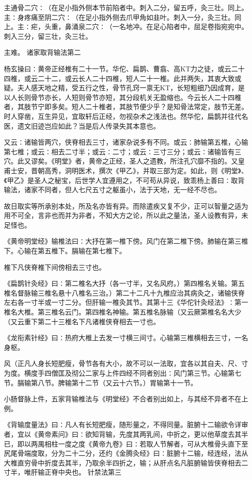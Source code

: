 \documentclass[a4paper,12pt,UTF8,twoside]{ctexbook}
\begin{document}
主通骨二穴∶（在足小指外侧本节前陷者中。刺入二分，留五呼，灸三壮。同上。主∶身疼痛至阴二穴∶（在足小指外侧去爪甲角如韭叶。刺入一分，灸三壮。同上。主∶疟，头重，鼻涌泉二穴∶（一名地冲。在足心陷者中，屈足卷指宛宛中。刺入三分，留三壮，灸三壮。

主难。
诸家取背输法第二

杨玄操曰∶黄帝正经椎有二十一节。华佗、扁鹊、曹翕、高KT力之徒，或云二十四椎，或云二十二，或云长人二十四椎，短人二十一椎。此并两失，其衷大致或疑。夫人感天地之精，受五行之性，骨节孔窍一禀无KT，长短粗细乃因成育，是以人长则骨节亦长，人短则骨节亦短，其分段机关无盈缩也。今云长人二十四椎者，其肢节宁即多矣。短人二十椎者，其肢节便少乎？是知骨法常定，肢节无差。时人穿凿，互生异见，宜取轩后正经，勿视杂术之浅法也。然华佗，扁鹊并往代名医，遗文旧迹岂应如此？当是后人传录失其本意也。

又云∶诸输皆两穴，侠脊相去三寸，诸家杂说多有不同。或云∶肺输第五椎，心输第七椎；或云∶相去二寸半；或云∶二寸；或云∶三寸三分；或云∶诸输皆有三穴。此又谬矣。《明堂》者，黄帝之正经，圣人之遗教，所注孔穴靡不指的。又皇甫士安，晋朝高秀，洞明医术，撰次《甲乙》，并取三部为定。如此，则《明堂》、《甲乙》是圣人之秘宝，后世学人宜遵用之，不可苟从异说，致乖杨上善曰∶取背输法，诸家不同者，但人七尺五寸之躯虽小，法于天地，无一经不尽也。

故日取实等所承别本处，所及名亦皆有异。而除遣疾又复不少，正可以智量之适为用不可全，言非也而并为非者，不知大方之论，所以此之量法，圣人设教有异，未足怪也。

《黄帝明堂经》输椎法曰∶大抒在第一椎下傍。风门在第二椎下傍。肺输在第三椎下。心输在第五椎下。膈输在第七椎下。

椎下凡侠脊椎下间傍相去三寸也。

《扁鹊针灸经》曰∶第二椎名大抒（各一寸半，又名风府。）第四椎名关输。第五椎名督脉输三椎名悬十八椎名三治。）第二十二凡十九椎应治其病灸之，诸输侠脊左右各一寸半或一寸二分。但肝输一椎灸其节。其第十三《华佗针灸经法》∶第一椎名大椎。第三椎名云门。第四椎名神输。第五椎名脉输（又云厥第椎名名大少（又云重下第二十三椎名下凡诸椎侠脊相去一寸也。

《龙衔素针经》曰∶热府大椎上去发一寸横三间寸。心输第三椎横相去三寸，一名身枢。

风（正凡人身长短肥瘦，骨节各有大小，故不可以一法取，宜各以其自夫、尺、寸为度。横度手四僧匡及彻公二家与上件四经不同者别出∶风门第三节。心输第七节。膈输第八节。脾输第十二节（又云十六节。）胃输第十一节。

小肠督脉上件，五家背输椎法与《明堂经》不合者别出如上，与其经不异者不在上例。

《背输度量法》曰∶凡人有长短肥瘦，随形量之，不得同量。脏腑十二输欲令详审者，宜以《黄帝素问》曰∶欲知背输，先度其两乳间，中折之，更以他草度去其半已，即以两禺相柱一度之度《黄帝九卷》曰∶若取人节解者，可从大椎骨头直下至尻尾骨端度取，分为二十二分，还约《金腾灸经》曰∶脏腑十二输，经连经，法从大椎直穷骨中折度去其半，乃取余半四折之，输；从肝点名凡脏腑输皆侠脊相去二寸半，唯肝输正脊中央也。
针禁法第三
\end{document}
